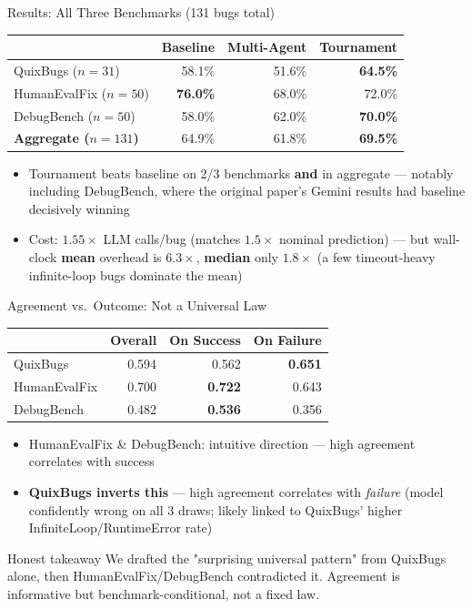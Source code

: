 \documentclass[aspectratio=169]{beamer}
\begin{document}
\begin{frame}{Results: All Three Benchmarks (131 bugs total)}
\begin{table}
\centering\small
\begin{tabular}{@{}lrrr@{}}
\toprule
 & Baseline & Multi-Agent & \textbf{Tournament} \\
\midrule
QuixBugs ($n{=}31$)     & 58.1\% & 51.6\% & \textbf{64.5\%} \\
HumanEvalFix ($n{=}50$) & \textbf{76.0\%} & 68.0\% & 72.0\% \\
DebugBench ($n{=}50$)   & 58.0\% & 62.0\% & \textbf{70.0\%} \\
\midrule
\textbf{Aggregate ($n{=}131$)} & 64.9\% & 61.8\% & \textbf{69.5\%} \\
\bottomrule
\end{tabular}
\end{table}
\begin{itemize}
    \item Tournament beats baseline on 2/3 benchmarks \textbf{and} in aggregate --- notably including DebugBench, where the original paper's Gemini results had baseline decisively winning
    \item Cost: $1.55\times$ LLM calls/bug (matches $1.5\times$ nominal prediction) --- but wall-clock \textbf{mean} overhead is $6.3\times$, \textbf{median} only $1.8\times$ (a few timeout-heavy infinite-loop bugs dominate the mean)
\end{itemize}
\end{frame}

\begin{frame}{Agreement vs.\ Outcome: Not a Universal Law}
\begin{table}
\centering\small
\begin{tabular}{@{}lrrr@{}}
\toprule
 & Overall & On Success & On Failure \\
\midrule
QuixBugs     & 0.594 & 0.562 & \textbf{0.651} \\
HumanEvalFix & 0.700 & \textbf{0.722} & 0.643 \\
DebugBench   & 0.482 & \textbf{0.536} & 0.356 \\
\bottomrule
\end{tabular}
\end{table}
\begin{itemize}
    \item HumanEvalFix \& DebugBench: intuitive direction --- high agreement correlates with success
    \item \textbf{QuixBugs inverts this} --- high agreement correlates with \emph{failure} (model confidently wrong on all 3 draws; likely linked to QuixBugs' higher InfiniteLoop/RuntimeError rate)
\end{itemize}
\begin{alertblock}{Honest takeaway}
We drafted the "surprising universal pattern" from QuixBugs alone, then HumanEvalFix/DebugBench contradicted it. Agreement is informative but benchmark-conditional, not a fixed law.
\end{alertblock}
\end{frame}
\end{document}
